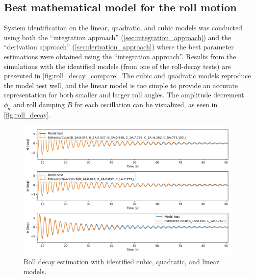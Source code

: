\subsection{Best mathematical model for the roll motion}
System identification on the linear, quadratic, and cubic models was conducted using both the ``integration approach'' (\autoref{sec:integration_approach}) and the ``derivation approach'' (\autoref{sec:derivation_approach}) where the best parameter estimations were obtained using the ``integration approach''.
Results from the simulations with the identified models (from one of the roll-decay tests) are presented in \autoref{fig:roll_decay_compare}. The cubic and quadratic models reproduce the model test well, and the linear model is too simple to provide an accurate representation for both smaller and larger roll angles. The amplitude decrement $\phi_a$ and roll damping $B$ for each oscillation can be visualized, as seen in \autoref{fig:roll_decay}.
\begin{figure}[h!]
    \centering
    \includegraphics[width=\linewidth]{kappa/images/roll_decay_model_compare.pdf}
    \caption{Roll decay estimation with identified cubic, quadratic, and linear models.}
    \label{fig:roll_decay_compare}
\end{figure}
